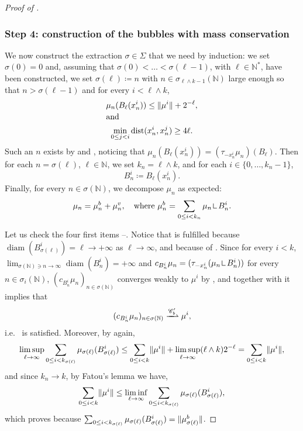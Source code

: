 \documentclass[11pt]{article}
\providecommand{\ie}{i.e.\ }
\theoremstyle{plain}
\theoremstyle{definition}
\newcommand{\N}{\mathbb{N}}
\newcommand{\Cspace}{\mathscr{C}}
\newcommand{\mres}{\mathop{\hbox{\vrule height 6pt width .5pt depth 0pt \vrule height .5pt width 4pt depth 0pt}}\nolimits}
\DeclarePairedDelimiter{\norm}{\lVert}{\rVert}
\DeclareMathOperator{\diam}{diam}
\DeclareMathOperator{\dist}{dist}
\newcommand{\narrowto}{\xrightharpoonup{\Cspace_b'}}
\numberwithin{equation}{section}
\begin{document}
\begin{proof}[Proof of ]
\subsubsection*{Step 4: construction of the bubbles with mass conservation}
We now construct the extraction \(\sigma\in\Sigma\) that we need by induction: we set \(\sigma(0)=0\) and, assuming that \(\sigma(0)<\dots<\sigma(\ell-1)\), with \(\ell\in\N^\ast\), have been constructed, we set \(\sigma(\ell)\coloneqq n\) with \(n\in\sigma_{\ell \wedge k -1}(\N)\) large enough so that $n > \sigma(\ell-1)$ and for every \(i< \ell \wedge k\),\vspace*{-3pt}
\begin{gather}
\mu_n(B_\ell(x^i_n))\le\norm{\mu^i}+2^{-\ell},\label{inductionBubbles1}\\[-3pt]
\shortintertext{and}
\min_{0\le j<i}\dist(x^i_n,x^j_n)\ge 4\ell.\label{inductionBubbles2}
\end{gather}
Such an \(n\) exists by  and , noticing that $\mu_n(B_\ell(x_n^i)) = (\tau_{-x_n^i} \mu_n)(B_\ell)$. Then for each \(n=\sigma(\ell)\), \(\ell\in\N\), we set \(k_n=\ell \wedge k\), and for each \(i\in\{0,\dots,k_n-1\}\),\vspace*{-3pt}
\[
B^i_n\coloneqq B_\ell(x^i_n).
\]
Finally, for every \(n\in\sigma(\N)\), we decompose $\mu_n$ as expected:\vspace*{-3pt}
\[
\mu_n = \mu^b_n + \mu^v_n,\quad \text{where } \mu^b_n = \sum_{0\le i < k_n} \mu_n \mres B_n^i.
\]

Let us check the four first items --. Notice that  is fulfilled because $\diam(B_{\sigma(\ell)}^i) = \ell \to +\infty$ as $\ell\to\infty$, and  because of . Since for every $i<k$, $\lim_{\sigma(\N)\ni n \to\infty}\diam(B_n^i) = +\infty$ and $c_{B_n^i} \mu_n = (\tau_{-x_n^i} (\mu_n\mres B_n^i))$ for every $n \in \sigma_i(\N)$, $(c_{B_n^i} \mu_n)_{n\in\sigma(\N)}$ converges weakly to $\mu^i$ by , and together with  it implies that\vspace*{-3pt}
\[(c_{B_n^i} \mu_n)_{n\in\sigma(\N)} \narrowto \mu^i,\]
\ie {} is satisfied.
Moreover, by  again,\vspace*{-3pt}
\[
\limsup_{\ell\to\infty}\sum_{0\le i<k_{\sigma(\ell)}}\mu_{\sigma(\ell)}(B^i_{\sigma(\ell)})\le \sum_{0\le i<k}\norm{\mu^i}+\limsup_{\ell\to\infty}(\ell \wedge k) 2^{-\ell}=\sum_{0\le i<k}\norm{\mu^i},
\]
and since $k_n \to k$, by Fatou's lemma we have,\vspace*{-3pt}
\[\sum_{0\leq i < k}\norm{\mu^i} \leq \liminf_{\ell\to\infty}\sum_{0\le i<k_{\sigma(\ell)}}\mu_{\sigma(\ell)}(B^i_{\sigma(\ell)}),\]
which proves  because $ \sum_{0\le i<k_{\sigma(\ell)}}\mu_{\sigma(\ell)}(B^i_{\sigma(\ell)}) = \norm{\mu^b_{\sigma(\ell)}}$.


\end{proof}
\end{document}
